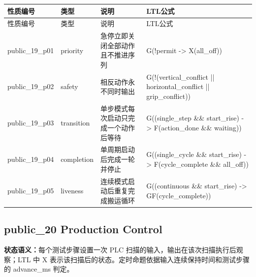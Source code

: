 \begin{longtable}{L{2.3cm}L{1.7cm}L{4.1cm}L{5.2cm}}

\toprule

性质编号 & 类型 & 说明 & LTL公式\\

\midrule

\endfirsthead

\toprule

性质编号 & 类型 & 说明 & LTL公式\\

\midrule

\endhead

{\ttfamily public\_19\_p01} & priority & 急停立即关闭全部动作且不推进序列 & {\ttfamily G(!permit -> X(all\_off))}\\

{\ttfamily public\_19\_p02} & safety & 相反动作永不同时输出 & {\ttfamily G(!(vertical\_conflict || horizontal\_conflict || grip\_conflict))}\\

{\ttfamily public\_19\_p03} & transition & 单步模式每次启动只完成一个动作后等待 & {\ttfamily G((single\_step \&\& start\_rise) -> F(action\_done \&\& waiting))}\\

{\ttfamily public\_19\_p04} & completion & 单周期启动后完成一轮并停止 & {\ttfamily G((single\_cycle \&\& start\_rise) -> F(cycle\_complete \&\& all\_off))}\\

{\ttfamily public\_19\_p05} & liveness & 连续模式启动后重复完成搬运循环 & {\ttfamily G((continuous \&\& start\_rise) -> GF(cycle\_complete))}\\

\bottomrule

\end{longtable}

\subsection{{\ttfamily public\_20} Production Control}

\noindent\textbf{状态语义：}每个测试步骤设置一次 PLC 扫描的输入，输出在该次扫描执行后观察；LTL 中 X 表示该扫描后的状态。定时命题依据输入连续保持时间和测试步骤的 advance\_ms 判定。

